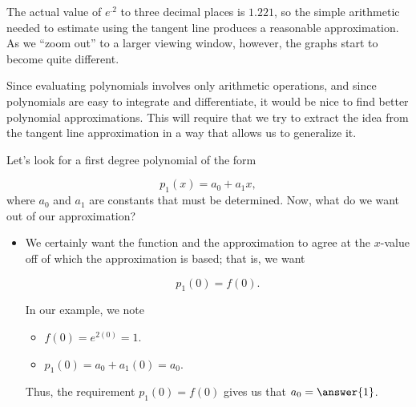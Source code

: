 \documentclass{ximera}
\begin{document}
\begin{model}
The actual value of $e^{.2}$ to three decimal places is $1.221$, so the simple arithmetic needed to estimate using the tangent line produces a reasonable approximation.  As we ``zoom out'' to a larger viewing window, however, the graphs start to become quite different.

\begin{image}
\end{image}

Since evaluating polynomials involves only arithmetic operations, and since polynomials are easy to integrate and differentiate, it would be nice to find better polynomial approximations.  This will require that we try to extract the idea from the tangent line approximation in a way that allows us to generalize it.

Let's look for a first degree polynomial of the form 

\[
p_1(x) = a_0+a_1x,
\]
where $a_0$ and $a_1$ are constants that must be determined.  Now, what do we want out of our approximation?

\begin{itemize}
\item We certainly want the function and the approximation to agree at the $x$-value off of which the approximation is based; that is, we want

\[
p_1(0) =f(0).
\]

In our example, we note

\begin{itemize}
\item $f(0) = e^{2(0)} =1$.
\item $p_1(0) = a_0+a_1(0) = a_0$.
\end{itemize}
Thus, the requirement $p_1(0) =f(0)$ gives us that $a_0=\answer{1}$.
 

\end{itemize}
\end{model}
\end{document}
